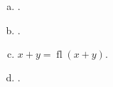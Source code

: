 \begin{frame}
	\begin{solution}
		\begin{enumerate}[a)]
			\item

			      .

			\item

			      .

			\item

			      \begin{math}
				      x+y=
				      \operatorname{fl}\left(x+y\right).
			      \end{math}

			\item

			      .
		\end{enumerate}
	\end{solution}
\end{frame}